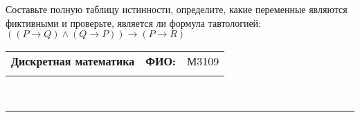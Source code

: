 \documentclass[10pt]{exam}
\newcommand{\class}{Дискретная математика}
\newcommand{\examdate}{}
\begin{document}
\begin{questions}
\begin{enumerate} [a)]
\end{enumerate}\question Составьте полную таблицу истинности, определите, какие переменные являются фиктивными и проверьте, является ли формула тавтологией:
$(( P \rightarrow Q) \land (Q \rightarrow P)) \rightarrow (P \rightarrow R)$

\end{questions}
\newpage
\begin{flushright}
\begin{tabular}{p{2.8in} r l}
\textbf{\class} & \textbf{ФИО:} &М3109
\\

\textbf{\examdate} &&\\
\end{tabular}\\
\end{flushright}
\rule[1ex]{\textwidth}{.1pt}
\end{document}
